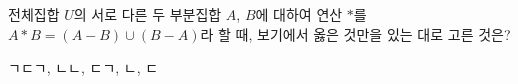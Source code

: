 전체집합 $U$의 서로 다른 두 부분집합 $A$, $B$에 대하여 연산 $\ast$를 $A\ast B=(A-B)\cup(B-A)$라 할 때, 보기에서 옳은 것만을 있는 대로 고른 것은? 
\begin{choices32}{ㄱ}{ㄷ}{ㄱ, ㄴ}{ㄴ, ㄷ}{ㄱ, ㄴ, ㄷ}\end{choices32}

